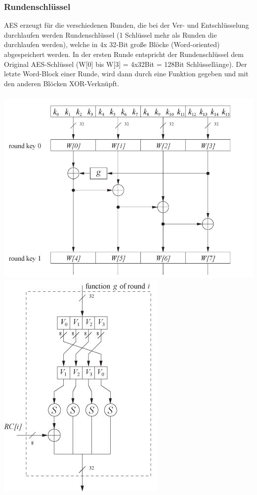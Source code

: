 \documentclass[10pt, a4paper]{scrreprt}
\begin{document}
\subsubsection{Rundenschlüssel}
AES erzeugt für die verschiedenen Runden, die bei der Ver- und Entschlüsselung durchlaufen werden Rundenschlüssel (1 Schlüssel mehr als Runden die durchlaufen werden), welche in 4x 32-Bit große Blöcke (Word-oriented) abgespeichert werden. In der ersten Runde entspricht der Rundenschlüssel dem Original AES-Schlüssel (W[0] bis W[3] = 4x32Bit = 128Bit Schlüssellänge). Der letzte Word-Block einer Runde, wird dann durch eine Funktion gegeben und mit den anderen Blöcken XOR-Verknüpft. \\ \\
\includegraphics[scale=0.5]{key_sched_1_round.JPG} 
\includegraphics[scale=0.5]{aes_key_sched_function_g.JPG} \\
\end{document}
